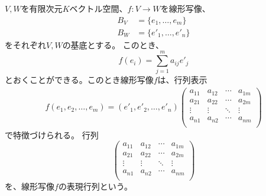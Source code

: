 \begin{theorem}[線形写像の行列表示]
  $V,W$を有限次元$K$ベクトル空間、$f:V\to W$を線形写像、
  \begin{align*}
    B_V&=\{e_1,\dots,e_m\}\\
    B_W&=\{e'_1,\dots,e'_n\}
  \end{align*}
  をそれぞれ$V,W$の基底とする。
  このとき、
  \[
    f(e_i)=\sum_{j=1}^ma_{ij}e'_j
  \]
  とおくことができる。このとき線形写像$f$は、行列表示
  \begin{align*}
    f(e_1,e_2,\dots,e_m)=(e'_1,e'_2,\dots,e'_n)\begin{pmatrix}
      a_{11} & a_{12} & \cdots & a_{1m}\\
      a_{21} & a_{22} & \cdots & a_{2m}\\
      \vdots & \vdots & \ddots & \vdots\\
      a_{n1} & a_{n2} & \cdots & a_{nm}\\
    \end{pmatrix}
  \end{align*}
  で特徴づけられる。
  行列
  \[
    \begin{pmatrix}
      a_{11} & a_{12} & \cdots & a_{1m}\\
      a_{21} & a_{22} & \cdots & a_{2m}\\
      \vdots & \vdots & \ddots & \vdots\\
      a_{n1} & a_{n2} & \cdots & a_{nm}\\
    \end{pmatrix}
  \]
  を、線形写像$f$の表現行列という。
\end{theorem}
